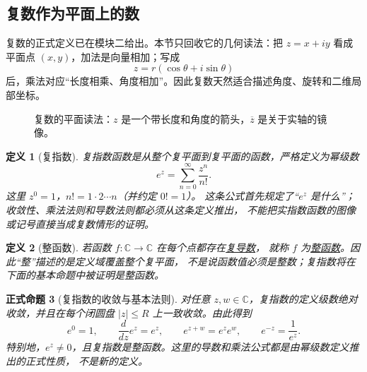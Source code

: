 \documentclass[UTF8,fontset=none,a4paper,11pt]{ctexart}
\theoremstyle{foundation-definition}
\newtheorem{definition}{定义}[section]
\theoremstyle{foundation-theorem}
\theoremstyle{foundation-proposition}
\newtheorem{proposition}[definition]{正式命题}
\theoremstyle{foundation-example}
\theoremstyle{foundation-remark}
\theoremstyle{foundation-theorem}
\newcommand{\term}[2]{\hyperref[#1]{#2}}
\begin{document}
\subsection{复数作为平面上的数}

复数的正式定义已在模块二给出。本节只回收它的几何读法：把
\(z=x+iy\) 看成平面点 \((x,y)\)，加法是向量相加；写成
\[
z=r(\cos\theta+i\sin\theta)
\]
后，乘法对应“长度相乘、角度相加”。因此复数天然适合描述角度、旋转和二维局部坐标。

\begin{figure}[htbp]
\centering
{}
\caption{复数的平面读法：\(z\) 是一个带长度和角度的箭头，\(\overline z\) 是关于实轴的镜像。}
\label{fig:complex-plane-polar}
\end{figure}

\begin{definition}[复指数]\label{def:complex-exponential}
复指数函数是从整个复平面到复平面的函数，严格定义为幂级数
\[
e^z=\sum_{n=0}^{\infty}\frac{z^n}{n!}.
\]
这里 \(z^0=1\)，\(n!=1\cdot2\cdots n\)（并约定 \(0!=1\)）。
这条公式首先规定了“\(e^z\) 是什么”；收敛性、乘法法则和导数法则都必须从这条定义推出，
不能把实指数函数的图像或记号直接当成复数情形的证明。
\end{definition}

\begin{definition}[整函数]\label{def:entire-function}
若函数 \(f:\mathbb C\to\mathbb C\) 在每个点都存在\term{def:complex-derivative}{复导数}，
就称 \(f\) 为\term{def:entire-function}{整函数}。因此“整”描述的是定义域覆盖整个复平面，
不是说函数值必须是整数；复指数将在下面的基本命题中被证明是整函数。
\end{definition}

\begin{proposition}[复指数的收敛与基本法则]\label{prop:complex-exponential-basic}
对任意 \(z,w\in\mathbb C\)，复指数的定义级数绝对收敛，并且在每个闭圆盘
\(\lvert z\rvert\le R\) 上一致收敛。由此得到
\[
e^0=1,
\qquad
\frac{d}{dz}e^z=e^z,
\qquad
e^{z+w}=e^ze^w,
\qquad
e^{-z}=\frac1{e^z}.
\]
特别地，\(e^z\ne0\)，且复指数是整函数。这里的导数和乘法公式都是由幂级数定义推出的正式性质，
不是新的定义。
\end{proposition}
\end{document}
